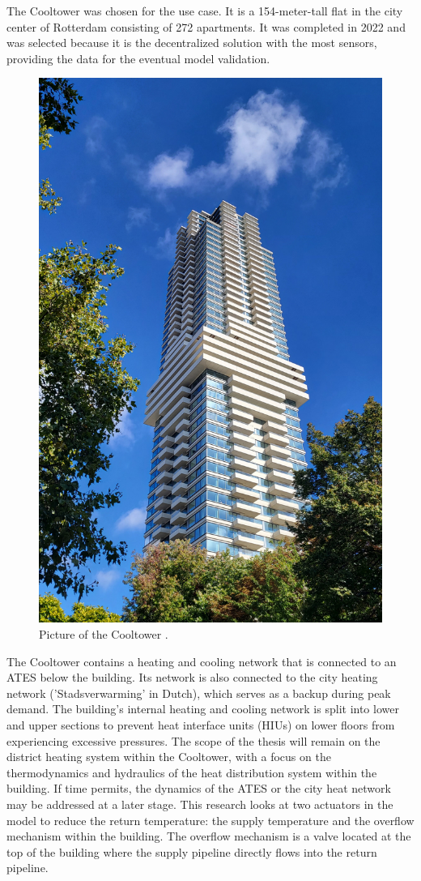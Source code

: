 The Cooltower was chosen for the use case. It is a 154-meter-tall flat in the city center of Rotterdam consisting of 272 apartments. It was completed in 2022 and was selected because it is the decentralized solution with the most sensors, providing the data for the eventual model validation.

\begin{figure}[h]
    \centering
    \includegraphics[width=0.5\linewidth]{figuresLIT/Cooltorenfoto.jpg}
    \caption{Picture of the Cooltower \cite{fotoCooltoren}.}
    \label{fig:Cooltoren}
\end{figure}

The Cooltower contains a heating and cooling network that is connected to an ATES below the building. Its network is also connected to the city heating network ('Stadsverwarming' in Dutch), which serves as a backup during peak demand. The building's internal heating and cooling network is split into lower and upper sections to prevent heat interface units (HIUs) on lower floors from experiencing excessive pressures. The scope of the thesis will remain on the district heating system within the Cooltower, with a focus on the thermodynamics and hydraulics of the heat distribution system within the building. If time permits, the dynamics of the ATES or the city heat network may be addressed at a later stage.
This research looks at two actuators in the model to reduce the return temperature: the supply temperature and the overflow mechanism within the building. The overflow mechanism is a valve located at the top of the building where the supply pipeline directly flows into the return pipeline. 


